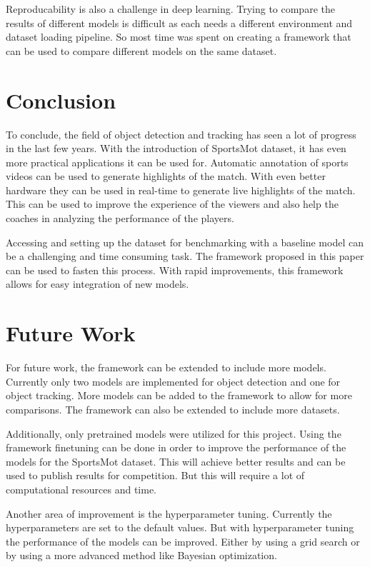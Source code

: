 \documentclass[runningheads]{llncs}
\begin{document}
Reproducability is also a challenge in deep learning.
Trying to compare the results of different models is difficult as each needs a different environment and dataset loading pipeline.
So most time was spent on creating a framework that can be used to compare different models on the same dataset.

\section{Conclusion}
To conclude, the field of object detection and tracking has seen a lot of progress in the last few years.
With the introduction of SportsMot dataset, it has even more practical applications it can be used for.
Automatic annotation of sports videos can be used to generate highlights of the match.
With even better hardware they can be used in real-time to generate live highlights of the match.
This can be used to improve the experience of the viewers and also help the coaches in analyzing the performance of the players.

Accessing and setting up the dataset for benchmarking with a baseline model can be a challenging and time consuming task.
The framework proposed in this paper can be used to fasten this process.
With rapid improvements, this framework allows for easy integration of new models.

\section{Future Work}
For future work, the framework can be extended to include more models.
Currently only two models are implemented for object detection and one for object tracking.
More models can be added to the framework to allow for more comparisons.
The framework can also be extended to include more datasets.

Additionally, only pretrained models were utilized for this project.
Using the framework finetuning can be done in order to improve the performance of the models for the SportsMot dataset.
This will achieve better results and can be used to publish results for competition.
But this will require a lot of computational resources and time.

Another area of improvement is the hyperparameter tuning.
Currently the hyperparameters are set to the default values.
But with hyperparameter tuning the performance of the models can be improved.
Either by using a grid search or by using a more advanced method like Bayesian optimization.

%
%


\nocite{*}
\end{document}
